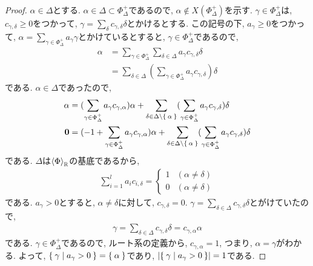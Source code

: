\begin{proof}
  $\alpha\in\Delta$とする.
  $\alpha\in\Delta \subset \Phi_\Delta^+$であるので,
  $\alpha\not\in X(\Phi_\Delta^+)$を示す.
  $\gamma\in\Phi_\Delta^+$は,
  $c_{\gamma,\delta}\geq 0$をつかって,
  $\gamma=\sum_{\delta}c_{\gamma,\delta}\delta$とかけるとする.
  この記号の下,
  $a_\gamma\geq 0$をつかって,
  $\alpha=\sum_{\gamma\in\Phi_\Delta^+}a_\gamma\gamma$とかけているとすると,
  $\gamma\in \Phi_\Delta^+$であるので,
  \begin{align*}
    \alpha
    &=\sum_{\gamma\in\Phi_\Delta^+}\sum_{\delta\in\Delta}a_\gamma c_{\gamma,\delta}\delta\\
    &=\sum_{\delta\in\Delta}(\sum_{\gamma\in\Phi_\Delta^+}a_\gamma c_{\gamma,\delta})\delta
  \end{align*}
  である. $\alpha\in\Delta$であったので,
  \begin{align*}
    \alpha
    &=
    (\sum_{\gamma\in\Phi_\Delta^+}a_\gamma c_{\gamma,\alpha})\alpha
    +\sum_{\delta\in\Delta\setminus\Set{\alpha}}(\sum_{\gamma\in\Phi_\Delta^+}a_\gamma c_{\gamma,\delta})\delta\\
    \boldsymbol{0}
    &=
    (-1+\sum_{\gamma\in\Phi_\Delta^+}a_\gamma c_{\gamma,\alpha})\alpha
    +\sum_{\delta\in\Delta\setminus\Set{\alpha}}(\sum_{\gamma\in\Phi_\Delta^+}a_\gamma c_{\gamma,\delta})\delta
  \end{align*}
  である. 
  $\Delta$は$\Braket{\Phi}_{\mathbb{R}}$の基底であるから,　
  \begin{align*}
    \sum_{i=1}^la_i c_{i,\delta}=
    \begin{cases}
      1 &  (\alpha\neq\delta)\\
      0 & (\alpha\neq\delta)
    \end{cases}
  \end{align*}
  である.
  $a_\gamma>0$とすると,
  $\alpha\neq\delta$に対して, $c_{\gamma,\delta}=0$.
  $\gamma=\sum_{\delta\in\Delta}c_{\gamma,\delta}\delta$とがけていたので,
  \begin{align*}
    \gamma=\sum_{\delta\in\Delta}c_{\gamma,\delta}\delta=c_{\gamma,\alpha}\alpha
  \end{align*}
  である.
  $\gamma\in\Phi_\Delta^+$であるので, ルート系の定義から,
  $c_{\gamma,\alpha}=1$, つまり, $\alpha=\gamma$がわかる.
  よって, $\Set{\gamma|a_\gamma>0}=\Set{\alpha}$であり,
  $\left|\Set{\gamma|a_\gamma>0}\right|=1$である.

\end{proof}

